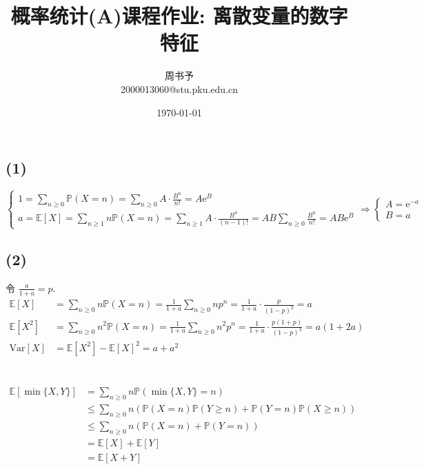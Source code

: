 \documentclass[8pt]{article}
\title{\heiti\zihao{2} 概率统计(A)课程作业: 离散变量的数字特征}
\author{\kaishu\zihao{-3} 周书予\\2000013060@stu.pku.edu.cn}
\date{\today}
\theoremstyle{compact}
\def\le{\leqslant}
\def\ge{\geqslant}
\def\P#1{\mathbb{P}\left({#1}\right)}
\def\e{\mathrm{e}}
\def\E#1{\mathbb{E}\left[{#1}\right]}
\def\Var#1{\text{Var}\left[{#1}\right]}
\begin{document}
\pagestyle{plain}

\maketitle
\section{}
\subsection*{(1)} $$
	\begin{cases}
		1 = \sum_{n \ge 0}\P{X = n} = \sum_{n \ge 0}A\cdot \frac{B^n}{n!} = A\e^B \\
		a = \E{X} = \sum_{n \ge 1}n\P{X = n} = \sum_{n \ge 1}A\cdot \frac{B^n}{(n-1)!} = AB \sum_{n \ge 0}\frac{B^n}{n!} = AB\e^B
	\end{cases} \Rightarrow
	\begin{cases}
		A = \e^{-a}\\
		B = a
	\end{cases}
	$$
	\subsection*{(2)}
	 令 $\frac{a}{1+a} = p$. \begin{equation*}
		\begin{split}
			\E{X} &= \sum_{n \ge 0}n\P{X = n} = \frac{1}{1+a}\sum_{n \ge 0}np^n = \frac{1}{1+a}\cdot\frac{p}{(1-p)^2} = a\\
			\E{X^2} &= \sum_{n \ge 0}n^2\P{X = n} = \frac{1}{1+a}\sum_{n \ge 0}n^2p^n = \frac{1}{1+a}\cdot\frac{p(1+p)}{(1-p)^3} = a(1+2a)\\
			\Var{X} &= \E{X^2} - \E{X}^2 = a + a^2
		\end{split}
	\end{equation*}
\section{}
\begin{equation*}
	\begin{split}
		\E{\min\{X, Y\}} &= \sum_{n \ge 0}n\P{\min\{X, Y\} = n}\\
		&\le \sum_{n \ge 0}n(\P{X = n}\P{Y \ge n} + \P{Y = n}\P{X \ge n})\\
		&\le \sum_{n \ge 0}n(\P{X = n} + \P{Y = n})\\
		&= \E{X} + \E{Y}\\
		&= \E{X + Y}
	\end{split}
\end{equation*}
\end{document}

